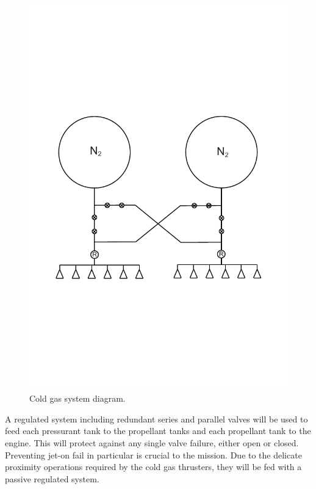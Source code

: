 \documentclass[paper=letter, fontsize=11pt]{scrartcl} %
\numberwithin{equation}{section} %
\numberwithin{figure}{section} %
\numberwithin{table}{section} %
\begin{document}
\begin{figure}[H]
    \begin{center}
        \includegraphics[height=.35\textheight]{cold_gas_system_diagram.pdf}
        \caption{Cold gas system diagram.}
    \end{center}
\end{figure}

A regulated system including redundant series and parallel valves will be used to feed each pressurant tank to the propellant tanks and each propellant tank to the engine. This will protect against any single valve failure, either open or closed. Preventing jet-on fail in particular is crucial to the mission. Due to the delicate proximity operations required by the cold gas thrusters, they will be fed with a passive regulated system.
\end{document}
